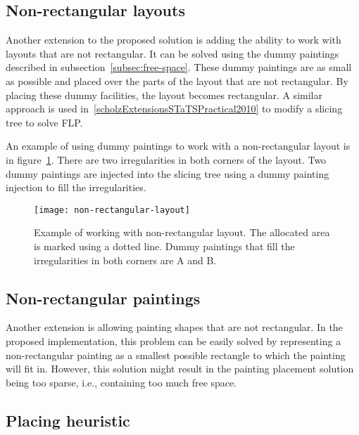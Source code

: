 \subsection{Non-rectangular layouts}\label{subsec:non-rectangular-layouts}

Another extension to the proposed solution is adding the ability to work with layouts that are not rectangular.
It can be solved using the dummy paintings described in subsection~\ref{subsec:free-space}.
These dummy paintings are as small as possible and placed over the parts of the layout that are not rectangular.
By placing these dummy facilities, the layout becomes rectangular.
A similar approach is used in~\ref{scholzExtensionsSTaTSPractical2010} to modify a slicing tree to solve FLP.

An example of using dummy paintings to work with a non-rectangular layout is in figure~\ref{fig:non-rectangular-layout}.
There are two irregularities in both corners of the layout.
Two dummy paintings are injected into the slicing tree using a dummy painting injection to fill the irregularities.

\begin{figure}[h!]
    \texttt{[image: non-rectangular-layout]}
    \caption[Example of working with non-rectangular layout.]{Example of working with non-rectangular layout. The allocated area is marked using a dotted line.
    Dummy paintings that fill the irregularities in both corners are A and B.}
    \label{fig:non-rectangular-layout}
\end{figure}


\subsection{Non-rectangular paintings}\label{subsec:non-rectangular-paintings}

Another extension is allowing painting shapes that are not rectangular.
In the proposed implementation, this problem can be easily solved by representing
a non-rectangular painting as a smallest possible rectangle to which the painting will fit in.
However, this solution might result in the painting placement solution being too sparse,
i.e., containing too much free space.

\subsection{Placing heuristic}\label{subsec:placing-heuristic}

